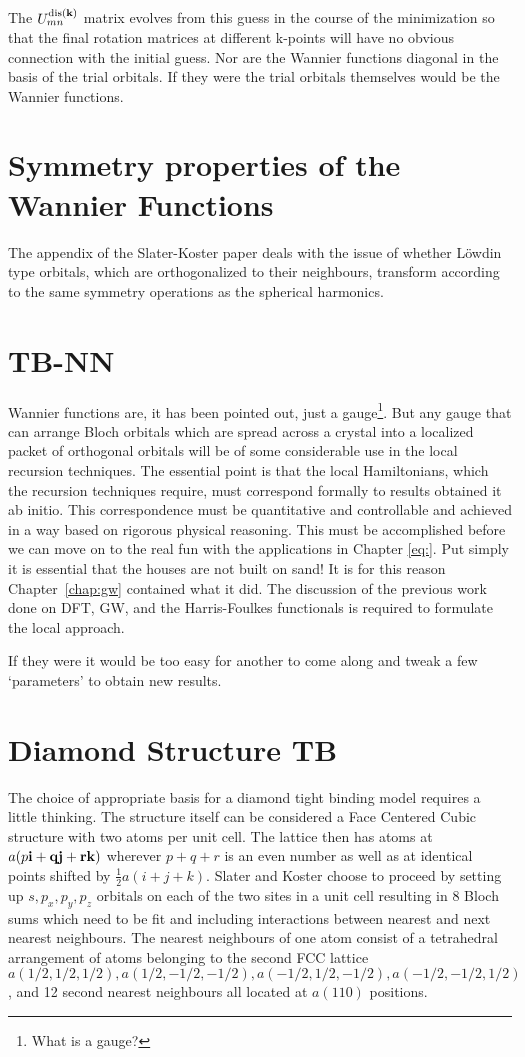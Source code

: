 The $U^{{\rm dis}({\bf k})}_{mn}$ matrix evolves from this guess in the course of the 
minimization so that the final rotation matrices at different k-points will have no 
obvious connection with the initial guess. Nor are the Wannier functions diagonal in the basis 
of the trial orbitals. If they were the trial orbitals themselves would be the Wannier functions. 

\section{Symmetry properties of the Wannier Functions}
The appendix of the Slater-Koster paper deals with the issue of whether L\"owdin type
orbitals, which are orthogonalized to their neighbours, transform according to the same
symmetry operations as the spherical harmonics.

\section{TB-NN}
Wannier functions are, it has been pointed out, just a gauge\footnote{What is a gauge?}. But
any gauge that can arrange Bloch orbitals which are spread across a crystal into a localized
packet of orthogonal orbitals will be of some considerable use in the local recursion techniques.
The essential point is that the local Hamiltonians, which the recursion techniques require,
must correspond formally to results obtained {it ab initio}. 
This correspondence must be quantitative and controllable and achieved in 
a way based on rigorous physical reasoning. 
This must be accomplished before we can move on to the real fun with the 
applications in Chapter \ref{eq:}.
Put simply it is essential that the houses are not built on sand! 
It is for this reason Chapter~\ref{chap:gw} contained what it did. The discussion of 
the previous work done on DFT, GW, and the Harris-Foulkes functionals is required to formulate
the local approach.

If they were it would be too easy for another to come along and tweak a few `parameters' to obtain 
new results. 

\section{Diamond Structure TB}
The choice of appropriate basis for a diamond tight binding model requires a little thinking.
The structure itself can be considered a Face Centered Cubic structure with two atoms per unit cell.
The lattice then has atoms at $a(p\bf{i} + q\bf{j} + r\bf{k})$ wherever $p+q+r$ is an even number
as well as at identical points shifted by $\frac{1}{2}a(i+j+k)$. Slater and Koster choose to proceed
by setting up $s,p_{x},p_{y},p_{z}$ orbitals on each of the two sites in a unit cell resulting in 8 
Bloch sums which need to be fit and including interactions between nearest and next nearest neighbours.
The nearest neighbours of one atom consist of a tetrahedral arrangement of atoms belonging to the 
second FCC lattice $a(1/2,1/2,1/2), a(1/2,-1/2,-1/2), a(-1/2,1/2,-1/2), a(-1/2,-1/2,1/2)$,
and 12 second nearest neighbours all located at $a(110)$ positions.

